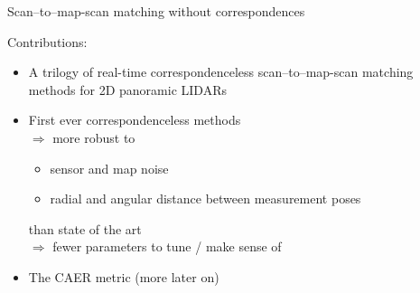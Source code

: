 \begin{frame}{Scan--to--map-scan matching without correspondences}

  Contributions:
  \begin{itemize}
    \item A trilogy of real-time correspondenceless scan--to--map-scan matching methods for 2D panoramic LIDARs
    \item First ever correspondenceless methods\\
    $\Rightarrow$ more robust to\\
    \begin{itemize}
      \item sensor and map noise
      \item radial and angular distance between measurement poses
    \end{itemize}
      than state of the art\\
    $\Rightarrow$ fewer parameters to tune / make sense of
    \item The CAER metric (more later on)
  \end{itemize}

\end{frame}

